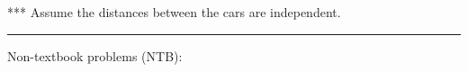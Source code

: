 \documentclass[12pt]{article}
\begin{document}

*** Assume the distances between the cars are independent.






\rule{500pt}{1pt}


 Non-textbook problems (NTB):          \label{NTB}

\begin{enumerate}  %


%
%
%
%
%
%





\end{enumerate}
\end{document}
